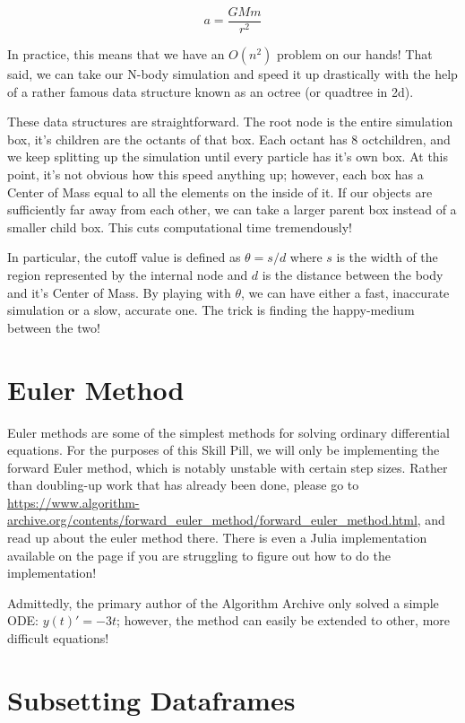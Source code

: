 \documentclass[11pt]{article}
\begin{document}
$$a = \frac{GMm}{r^2}$$

In practice, this means that we have an $O(n^2)$ problem on our hands! That said, we can take our N-body simulation and speed it up drastically with the help of a rather famous data structure known as an octree (or quadtree in 2d).

These data structures are straightforward. The root node is the entire simulation box, it's children are the octants of that box. Each octant has 8 octchildren, and we keep splitting up the simulation until every particle has it's own box. At this point, it's not obvious how this speed anything up; however, each box has a Center of Mass equal to all the elements on the inside of it. If our objects are sufficiently far away from each other, we can take a larger parent box instead of a smaller child box. This cuts computational time tremendously!

In particular, the cutoff value is defined as $\theta = s/d$ where $s$ is the width of the region represented by the internal node and $d$ is the distance between the body and it's Center of Mass. By playing with $\theta$, we can have either a fast, inaccurate simulation or a slow, accurate one. The trick is finding the happy-medium between the two!

\newpage
\section*{Euler Method}

Euler methods are some of the simplest methods for solving ordinary differential equations. For the purposes of this Skill Pill, we will only be implementing the forward Euler method, which is notably unstable with certain step sizes. Rather than doubling-up work that has already been done, please go to \url{https://www.algorithm-archive.org/contents/forward_euler_method/forward_euler_method.html}, and read up about the euler method there. There is even a Julia implementation available on the page if you are struggling to figure out how to do the implementation!

Admittedly, the primary author of the Algorithm Archive only solved a simple ODE: $y(t)' = -3t$; however, the method can easily be extended to other, more difficult equations!

\newpage
\section*{Subsetting Dataframes}
\end{document}
